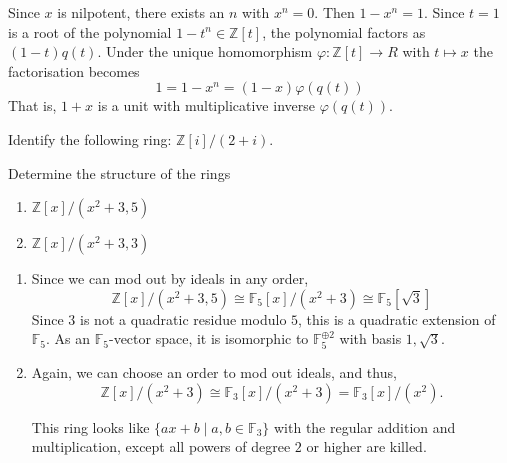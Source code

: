 \documentclass[12 pt, letterpaper]{hmcpset}
\begin{document}
\begin{solution}
	Since $x$ is nilpotent, there exists an $n$ with $x^{n} = 0$. Then $1 - x^{n} = 1$. Since $t = 1$ is a root of the polynomial $1 - t^{n} \in \mathbb{Z}[t]$, the polynomial factors as $(1 - t)q(t)$. Under the unique homomorphism $\varphi : \mathbb{Z}[t] \to R$ with $t \mapsto x$ the factorisation becomes
	\[
		1 = 1 - x^{n} = (1 - x)\varphi(q(t))
	\]
	That is, $1 + x$ is a unit with multiplicative inverse $\varphi(q(t))$.

\end{solution}

\pagebreak

\begin{problem}[10.]
	Identify the following ring: $\mathbb{Z}[i] / (2 + i)$.
\end{problem}

\pagebreak

\begin{problem}[11.]
	Determine the structure of the rings
	\begin{enumerate}
		\item $\mathbb{Z}[x] / (x^{2} + 3, 5)$ 
		\item $\mathbb{Z}[x] / (x^{2} + 3, 3)$
	\end{enumerate}
\end{problem}

\begin{solution}
	\begin{enumerate}
		\item Since we can mod out by ideals in any order,
			\[
				\mathbb{Z}[x] / (x^{2} + 3, 5) \cong \mathbb{F}_{5}[x] / (x^{2} + 3) \cong \mathbb{F}_{5}[\sqrt{3}]
			\]
			Since $3$ is not a quadratic residue modulo $5$, this is a quadratic extension of $\mathbb{F}_{5}$. As an $\mathbb{F}_{5}$-vector space, it is isomorphic to $\mathbb{F}_{5}^{\oplus 2}$ with basis $1, \sqrt{3}$.
			 

		 \item Again, we can choose an order to mod out ideals, and thus,
			  \[
			 	\mathbb{Z}[x] / (x^{2} + 3) \cong \mathbb{F}_{3}[x] / (x^{2} + 3) = \mathbb{F}_{3}[x] / (x^{2}).
			 \]

			 This ring looks like $\{ ax + b \mid a, b \in \mathbb{F}_{3} \}$ with the regular addition and multiplication, except all powers of degree $2$ or higher are killed.
	\end{enumerate}
\end{solution}
\end{document}
